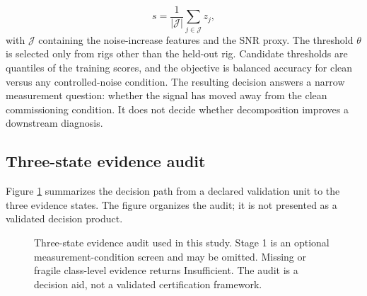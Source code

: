\documentclass[11pt]{article}
\begin{document}
\begin{equation}
s=\frac{1}{|\mathcal{J}|}\sum_{j\in\mathcal{J}} z_j,
\label{eq:gate-score}
\end{equation}
with $\mathcal{J}$ containing the noise-increase features and the SNR proxy.
The threshold $\theta$ is selected only from rigs other than the held-out rig.
Candidate thresholds are quantiles of the training scores, and the objective is
balanced accuracy for clean versus any controlled-noise condition. The
resulting decision answers a narrow measurement question: whether the signal
has moved away from the clean commissioning condition. It does not decide
whether decomposition improves a downstream diagnosis.

\subsection{Three-state evidence audit}

Figure \ref{fig:qualification-flow} summarizes the decision path from a
declared validation unit to the three evidence states. The figure organizes the
audit; it is not presented as a validated decision product.

\begin{figure}[t]
\centering
{}
\caption{Three-state evidence audit used in this study. Stage 1 is an optional
measurement-condition screen and may be omitted. Missing or fragile class-level
evidence returns Insufficient. The audit is a decision aid, not a validated
certification framework.}
\label{fig:qualification-flow}
\end{figure}
\end{document}
